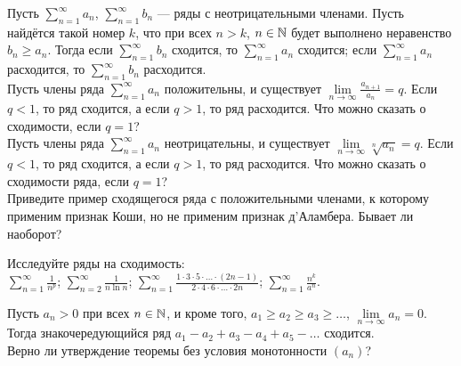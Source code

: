 \documentclass[a4paper,11pt]{article}
\begin{document}

\vspace*{-2mm}
\vspace*{-2mm}



Пусть $\sum\limits_{n=1}^\infty a_n$, $\sum\limits_{n=1}^\infty b_n$ --- ряды с неотрицательными членами.
Пусть найдётся такой номер $k$, что при всех $n>k$, $n\in\mathbb{N}$
будет выполнено неравенство $b_n\geqslant a_n$. Тогда если $\sum\limits_{n=1}^\infty b_n$ сходится, то
$\sum\limits_{n=1}^\infty a_n$ сходится; если $\sum\limits_{n=1}^\infty a_n$ расходится, то
$\sum\limits_{n=1}^\infty b_n$ расходится.
\\
Пусть члены ряда $\sum\limits_{n=1}^\infty a_n$
положительны, и
существует %
$\lim\limits_{n\to\infty}\frac{a_{n+1}}{a_n}=q$.
Если $q<1$, то
ряд сходится, а если %
$q>1$, то ряд расходится. Что можно сказать о сходимости, если $q=1$?
\\
Пусть члены ряда $\sum\limits_{n=1}^\infty a_n$ неотрицательны,
и существует %
$\lim\limits_{n\to\infty}\sqrt[n]{a_n}=q$.
Если $q<1$, то
ряд сходится, а если
$q>1$, то ряд расходится. Что можно сказать о сходимости ряда,
если $q=1$?
\\
Приведите пример сходящегося ряда
с положительными членами, к которому применим признак Коши,
но не применим признак д'Аламбера. Бывает ли наоборот?

Исследуйте ряды на сходимость:\\
$\sum\limits_{n=1}^\infty \frac1{n^p}$;
$\sum\limits_{n=2}^\infty \frac1{n\ln n}$;
$\sum\limits_{n=1}^\infty \frac{1\cdot3\cdot5\cdot\ldots\cdot(2n-1)}
{2\cdot4\cdot6\cdot\ldots\cdot2n}$;
$\sum\limits_{n=1}^\infty \frac{n^k}{a^n}$.


Пусть $a_n>0$ при всех $n\in\mathbb{N}$, и кроме того, $a_1\geqslant a_2\geqslant
a_3\geqslant\dots$, $\lim\limits_{n\to\infty}a_n=0$.
Тогда знакочередующийся ряд $a_1-a_2+a_3-a_4+a_5-\dots$ сходится.
\\
Верно ли утверждение теоремы без условия монотонности $(a_n)$?
\end{document}
